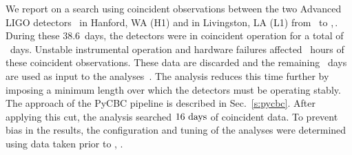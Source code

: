 We report on a search using coincident observations between the two Advanced
LIGO detectors~\cite{TheLIGOScientific:2014jea} in Hanford, WA (H1) and in
Livingston, LA (L1) from \OBSSTART\ to \OBSEND,\,\OBSYEAR. During these
$38.6$~days, the detectors were in coincident operation for a total of
\TotalAvailableCoincTime~days. Unstable instrumental operation and hardware
failures affected \CatOneVetoTime~hours of these coincident observations.
These data are discarded and the remaining \TotalCoincAfterCATOne~days are
used as input to the analyses~\cite{GW150914-DETCHAR}.  The \pycbc{} analysis reduces
this time further by imposing a minimum length over which the detectors must
be operating stably. The approach of the PyCBC pipeline is described
in Sec.~\ref{s:pycbc}.  After applying this cut, the \pycbc{} analysis
searched $16~\mathrm{days}$ of coincident data. To prevent bias in
the results, the configuration and tuning of the analyses were determined
using data taken prior to \OBSSTART, \OBSYEAR.

